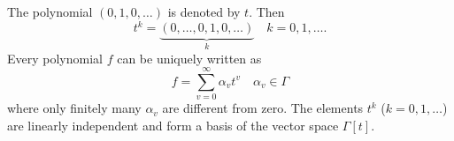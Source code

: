 The polynomial $(0, 1, 0, \ldots)$ is denoted by $t$. Then
$$t^k = \underbrace{(0, \ldots, 0, 1, 0, \ldots)}_{k} \quad k = 0, 1, \ldots.$$
Every polynomial $f$ can be uniquely written as
$$f = \sum_{v=0}^{\infty} \alpha_v t^v \quad \alpha_v \in \Gamma$$
where only finitely many $\alpha_v$ are different from zero. The elements $t^k$ ($k = 0, 1, \ldots$) are linearly independent and form a basis of the vector space $\Gamma[t]$.
